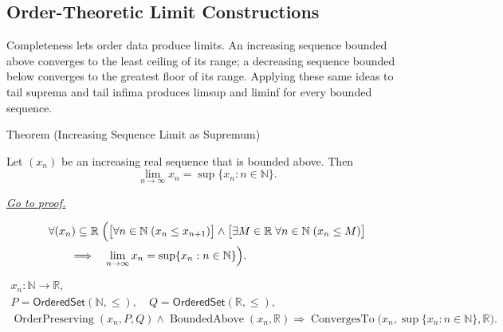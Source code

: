 \subsection*{Order-Theoretic Limit Constructions}
\begin{exposition}
Completeness lets order data produce limits. An increasing sequence bounded
above converges to the least ceiling of its range; a decreasing sequence
bounded below converges to the greatest floor of its range. Applying these
same ideas to tail suprema and tail infima produces limsup and liminf for
every bounded sequence.
\end{exposition}


\begin{theorembox}{Theorem (Increasing Sequence Limit as Supremum)}
\begin{theorem}
\label{thm:increasing-sequence-limit-as-supremum}
Let $(x_n)$ be an increasing real sequence that is bounded above. Then
\[
  \lim_{n\to\infty}x_n=\sup\{x_n:n\in\mathbb{N}\}.
\]

\smallskip
\noindent
\hyperref[prf:increasing-sequence-limit-as-supremum]{\textit{Go to proof.}}
\end{theorem}
\end{theorembox}

\begin{remark*}
\[
\begin{aligned}
&\forall (x_n)\subseteq\mathbb{R}\;
\Bigl(
  \bigl[\forall n\in\mathbb{N}\;(x_n\le x_{n+1})\bigr]
  \land
  \bigl[\exists M\in\mathbb{R}\;\forall n\in\mathbb{N}\;(x_n\le M)\bigr]\\
&\qquad\Longrightarrow\quad
  \lim_{n\to\infty}x_n=\sup\{x_n:n\in\mathbb{N}\}
\Bigr).
\end{aligned}
\]
\end{remark*}

\begin{remark*}
\[
\begin{gathered}
x_n\colon\mathbb{N}\to\mathbb{R},\\
P=\mathsf{OrderedSet}(\mathbb{N},\leq),\quad
Q=\mathsf{OrderedSet}(\mathbb{R},\leq),\\
\operatorname{OrderPreserving}(x_n,P,Q)
\land
\operatorname{BoundedAbove}(x_n,\mathbb{R})
\Longrightarrow
\operatorname{ConvergesTo}\bigl(x_n,\sup\{x_n:n\in\mathbb{N}\},\mathbb{R}\bigr).
\end{gathered}
\]
\end{remark*}

